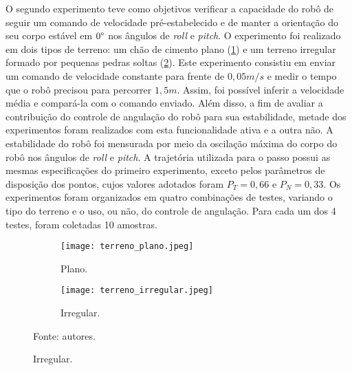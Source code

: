 \documentclass[../main.tex]{subfiles}
\begin{document}
  O segundo experimento teve como objetivos verificar a capacidade do robô de seguir um comando de velocidade pré-estabelecido e de manter a orientação do seu corpo estável em $0\degree$ nos ângulos de \textit{roll} e \textit{pitch}. O experimento foi realizado em dois tipos de terreno: um chão de cimento plano (\ref{fig:terreno_plano}) e um terreno irregular formado por pequenas pedras soltas (\ref{fig:terreno_irregular}). Este experimento consistiu em enviar um comando de velocidade constante para frente de $0,05 m/s$ e medir o tempo que o robô precisou para percorrer $1,5 m$. Assim, foi possível inferir a velocidade média e compará-la com o comando enviado. Além disso, a fim de avaliar a contribuição do controle de angulação do robô para sua estabilidade, metade dos experimentos foram realizados com esta funcionalidade ativa e a outra não. A estabilidade do robô foi mensurada por meio da oscilação máxima do corpo do robô nos ângulos de \textit{roll} e \textit{pitch}. A trajetória utilizada para o passo possui as mesmas especificações do primeiro experimento, exceto pelos parâmetros de disposição dos pontos, cujos valores adotados foram $P_T = 0,66$ e $P_N = 0,33$. Os experimentos foram organizados em quatro combinações de testes, variando o tipo do terreno e o uso, ou não, do controle de angulação. Para cada um dos 4 testes, foram coletadas 10 amostras.

  \begin{figure}[!htb]
    \centering
    \caption{Terrenos dos testes.}
    \begin{subfigure}[t]{0.24\textwidth}
      \centering
      \texttt{[image: terreno\_plano.jpeg]}
      \caption{Plano.}
      \label{fig:terreno_plano}
    \end{subfigure}
    \begin{subfigure}[t]{0.24\textwidth}
      \centering
      \texttt{[image: terreno\_irregular.jpeg]}
      \caption{Irregular.}
      \label{fig:terreno_irregular}
    \end{subfigure}
    \vfill
    Fonte: autores.
    \label{fig:terrenos}
  \end{figure}
  
\end{document}
